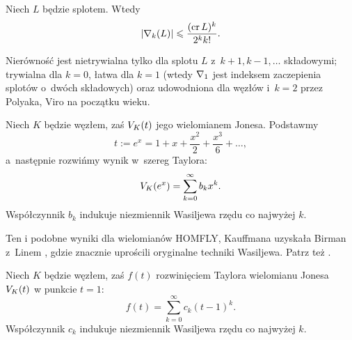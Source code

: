 \begin{conjecture}
    Niech $L$ będzie splotem.
    Wtedy
    \begin{equation}
        |\nabla_k(L)| \leqslant \frac{(\operatorname{cr} L)^k}{2^kk!}.
    \end{equation}
\end{conjecture}

Nierówność jest nietrywialna tylko dla splotu $L$ z~$k+1, k-1, \ldots$ składowymi; trywialna dla $k = 0$, łatwa dla $k=1$ (wtedy $\nabla_1$ jest indeksem zaczepienia splotów o~dwóch składowych) oraz udowodniona dla węzłów i~$k=2$ przez Polyaka, Viro \cite{polyak2001} na początku wieku.
%
%

\begin{example}
%
    Niech $K$ będzie węzłem, zaś $V_K(t)$ jego wielomianem Jonesa.
    Podstawmy
    \begin{equation}
        t := e^x = 1 + x + \frac{x^2}{2} + \frac{x^3}{6} + \ldots,
    \end{equation}
    a~następnie rozwińmy wynik w~szereg Taylora:
    \begin{equation}
        V_K(e^x) = \sum_{k = 0}^\infty b_k x^k.
    \end{equation}
    Współczynnik $b_{k}$ indukuje niezmiennik Wasiljewa rzędu co najwyżej $k$.
\end{example}

Ten i podobne wyniki dla wielomianów HOMFLY, Kauffmana uzyskała Birman z~Linem \cite{birman1993}, gdzie znacznie uprościli oryginalne techniki Wasiljewa.
%
%
Patrz też \cite[s. 56]{chmutov2012}.
%

\begin{example}
    Niech $K$ będzie węzłem, zaś $f(t)$ rozwinięciem Taylora wielomianu Jonesa $V_K(t)$ w punkcie $t = 1$:
    \begin{equation}
        f(t) = \sum_{k = 0}^\infty c_k (t-1)^k.
    \end{equation}
    Współczynnik $c_{k}$ indukuje niezmiennik Wasiljewa rzędu co najwyżej $k$.
\end{example}

